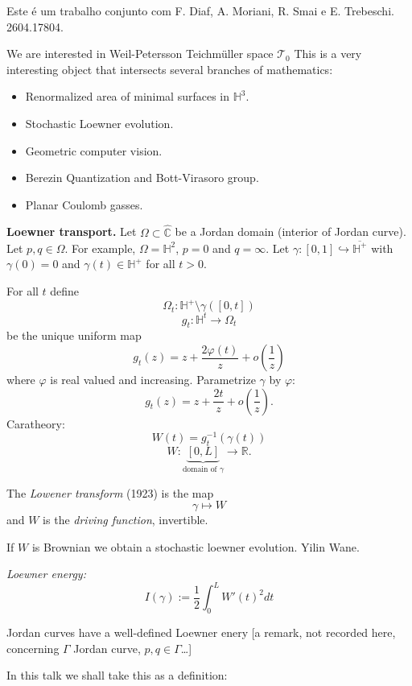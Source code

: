 Este é um trabalho conjunto com F. Diaf,
A. Moriani, R. Smai e E. Trebeschi.
2604.17804.

\medskip\noindent
We are interested in Weil-Petersson
Teichmüller space $\mathcal{T}_0$
This is a very interesting object
that intersects several branches of 
mathematics:
\begin{itemize}
\item Renormalized area of minimal surfaces
in $\mathbb{H}^3$.
\item Stochastic Loewner evolution.
\item Geometric computer vision.
\item Berezin Quantization and Bott-Virasoro
group.
\item Planar Coulomb gasses.
\end{itemize}

\medskip\noindent
{\bf Loewner transport.}
Let  $\Omega \subset \hat{\mathbb{C}}$
be a Jordan domain (interior of Jordan
curve).
Let $p,q \in \Omega$.
For example, $\Omega=\mathbb{H}^2$,
$p=0$ and $q=\infty$.
Let $\gamma:[0,1]\hookrightarrow
\overline{\mathbb{H}^+}$
with $\gamma(0)=0$ and $\gamma(t) \in
\mathbb{H}^+$ for all $t>0$.

For all $t$ define
$$
\Omega_t:\mathbb{H}^+\setminus
\gamma([0,t])
$$
$$
g_t:\mathbb{H}^t \to \Omega_t
$$
be the unique uniform map
$$
g_t(z)
=z + \frac{2\varphi(t)}{z}
+ o \left(\frac{1}{z}\right)
$$
where $\varphi$ is real valued and
increasing. Parametrize $\gamma$
by $\varphi$:
$$
g_t(z)=z+ \frac{2t}{z}
+o \left(\frac{1}{z}\right).
$$
Caratheory:
$$
W(t)=g^{-1}_t(\gamma(t))
$$
$$
W:\underbrace{[0,L]}_{\text{domain of }
\gamma} \to \mathbb{R}.
$$

The {\it Lowener transform} (1923)
is the map
$$
\gamma \mapsto W
$$
and $W$ is the {\it driving function},
invertible.

\begin{remark}
\label{remark-brownian-loewner}
If $W$ is Brownian we obtain a 
stochastic loewner evolution.
Yilin Wane.
\end{remark}

\medskip\noindent
{\it Loewner energy:}
$$
I(\gamma)
:= \frac{1}{2}
\int_0^L W'(t)^2 dt
$$
\begin{remark}
\label{remark-loewner-energy-independent}
Jordan curves have a well-defined
Loewner enery
[a remark, not recorded here, concerning
$\Gamma$ Jordan curve, $p,q \in \Gamma$…]
\end{remark}

\noindent
In this talk we shall take this
as a definition:

